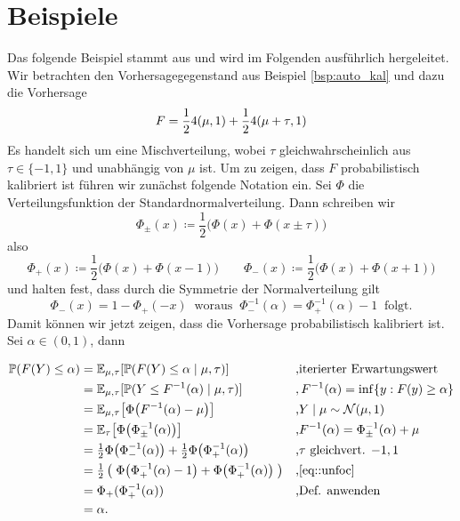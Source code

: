 \section{Beispiele}
\begin{bsp} \label{bsp:kalunfoc}
Das folgende Beispiel stammt aus \textcite{Gneiting2007} und wird im Folgenden ausführlich hergeleitet. Wir betrachten den Vorhersagegegenstand aus Beispiel \ref{bsp:auto_kal} und dazu die Vorhersage
\[
F=\frac{1}{2}4(\mu,1)+\frac{1}{2}4(\mu + \tau,1)
\]
Es handelt sich um eine Mischverteilung, wobei $\tau$ gleichwahrscheinlich aus $\tau \in \{-1,1\}$ und unabhängig von $\mu$ ist. Um zu zeigen, dass $F$ probabilistisch kalibriert ist führen wir zunächst folgende Notation ein. Sei $\Phi$ die Verteilungsfunktion der Standardnormalverteilung. Dann schreiben wir
\[
\Phi_\pm(x) \coloneqq \frac{1}{2}\big(\Phi(x)+\Phi(x \pm \tau) \big)
\]
also
\[
\Phi_+(x) \coloneqq \frac{1}{2}\big(\Phi(x)+\Phi(x - 1) \big) \qquad \Phi_-(x) \coloneqq \frac{1}{2}\big(\Phi(x)+\Phi(x + 1) \big)
\]
und halten fest, dass durch die Symmetrie der Normalverteilung gilt
\begin{equation} \label{eq::unfoc}
\Phi_-(x)=1-\Phi_+(-x) \;\; \text{woraus} \;\; \Phi^{-1}_-(\alpha)= \Phi^{-1}_+(\alpha)-1 \;\; \text{folgt}.
\end{equation}
Damit können wir jetzt zeigen, dass die Vorhersage probabilistisch kalibriert ist. Sei $\alpha \in (0,1)$, dann

\begin{align*}
    \mathbb{P}(F(Y) \le \alpha) &= \mathbb{E}_{\mu,\tau}[\mathbb{P}(F(Y) \le \alpha \mid \mu,\tau)]  && \text{,iterierter Erwartungswert}\\
                         &= \mathbb{E}_{\mu,\tau}[\mathbb{P}(Y \le F^{-1}(\alpha) \mid \mu,\tau)] && ,F^{-1}(\alpha)=\inf\{y: F(y)\ge \alpha\}  \\
                         &= \mathbb{E}_{\mu,\tau}\big[\Phi\big(F^{-1}(\alpha)-\mu \big)\big] && \text{,$Y \mid \mu \sim \mathcal{N}(\mu,1)$} \\
                         &= \mathbb{E}_\tau \big[\Phi\big(\Phi^{-1}_\pm(\alpha)\big)\big] && \text{,$F^{-1}(\alpha)=\Phi^{-1}_\pm(\alpha)+\mu$} \\
                         &= \tfrac{1}{2} \Phi\big(\Phi^{-1}_-(\alpha)\big) + \tfrac{1}{2} \Phi\big(\Phi^{-1}_+(\alpha)\big) && \text{,$\tau$ gleichvert. $-1, 1$} \\
                         &= \tfrac{1}{2}\left( \; \Phi\big(\Phi^{-1}_+(\alpha)-1\big) + \Phi\big(\Phi^{-1}_+(\alpha)\big) \; \right) && \text{,\eqref{eq::unfoc}} \\
                         &= \Phi_+(\Phi^{-1}_+(\alpha)) && \text{,Def. anwenden} \\
                         &= \alpha.
\end{align*}


\end{bsp}
